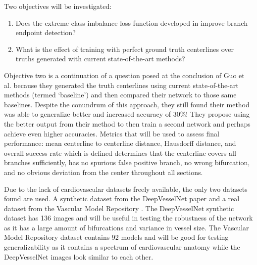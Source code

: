 \documentclass[10pt,twocolumn,letterpaper]{article}
\begin{document}
Two objectives will be investigated:
\begin{enumerate}
    \item Does the extreme class imbalance loss function developed in \cite{tettehDeepVesselNetVesselSegmentation2020} improve branch endpoint detection?
    \item What is the effect of training with perfect ground truth centerlines over truths generated with current state-of-the-art methods?
\end{enumerate}

Objective two is a continuation of a question posed at the conclusion of Guo et al. because they generated the truth centerlines using current state-of-the-art methods (termed `baseline') and then compared their network to those same baselines. Despite the conundrum of this approach, they still found their method was able to generalize better and increased accuracy of 30\%! They propose using the better output from their method to then train a second network and perhaps achieve even higher accuracies. Metrics that will be used to assess final performance: mean centerline to centerline distance, Hausdorff distance, and overall success rate which is defined determines that the centerline covers all branches sufficiently, has no spurious false positive branch, no wrong bifurcation, and no obvious deviation from the center throughout all sections.

Due to the lack of cardiovascular datasets freely available, the only two datasets found are used. A synthetic dataset from the DeepVesselNet paper and a real dataset from the Vascular Model Repository \cite{wilsonVascularModelRepository2013}. The DeepVesselNet synthetic dataset has 136 images and will be useful in testing the robustness of the network as it has a large amount of bifurcations and variance in vessel size. The Vascular Model Repository dataset contains 92 models and will be good for testing generalizability as it contains a spectrum of cardiovascular anatomy while the DeepVesselNet images look similar to each other.





{\small


}
\end{document}
